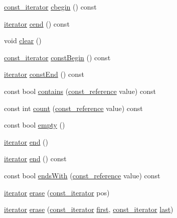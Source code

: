 \begin{DoxyCompactItemize}
\item 
\hyperlink{classprism_1_1_list_aafd1fe9c849b0369c3bf7bb0d456e0a3}{const\+\_\+iterator} \hyperlink{classprism_1_1_list_a305be84975076ea140f6f32be946225f}{cbegin} () const 
\item 
\hyperlink{classprism_1_1_list_a32f6b5634a5aabc496ccb652eb22c490}{iterator} \hyperlink{classprism_1_1_list_aab544551cf58b5ce23584c4f16d00d7e}{cend} () const 
\item 
void \hyperlink{classprism_1_1_list_a1e7dd9642cde1dca8834c8771560cd6b}{clear} ()
\item 
\hyperlink{classprism_1_1_list_aafd1fe9c849b0369c3bf7bb0d456e0a3}{const\+\_\+iterator} \hyperlink{classprism_1_1_list_af83c7a275d29cb26b5807c3b4cbbebf4}{const\+Begin} () const 
\item 
\hyperlink{classprism_1_1_list_a32f6b5634a5aabc496ccb652eb22c490}{iterator} \hyperlink{classprism_1_1_list_ab6464c9488a804007b2953a6a21b6e46}{const\+End} () const 
\item 
const bool \hyperlink{classprism_1_1_list_a47cd243e9c5db6058481d63ecc6ed5b7}{contains} (\hyperlink{classprism_1_1_list_aa263682b12cb5ca200c1b30f85fac524}{const\+\_\+reference} value) const 
\item 
const int \hyperlink{classprism_1_1_list_a7dbdab274aecfdc26b7d208f80772a78}{count} (\hyperlink{classprism_1_1_list_aa263682b12cb5ca200c1b30f85fac524}{const\+\_\+reference} value) const 
\item 
const bool \hyperlink{classprism_1_1_list_ae6b3ff8409a6548b695a9173a8bd4555}{empty} ()
\item 
\hyperlink{classprism_1_1_list_a32f6b5634a5aabc496ccb652eb22c490}{iterator} \hyperlink{classprism_1_1_list_a66e9cfc2a547294304d4fae086297bec}{end} ()
\item 
\hyperlink{classprism_1_1_list_a32f6b5634a5aabc496ccb652eb22c490}{iterator} \hyperlink{classprism_1_1_list_a36cedb2a64bbbe94da0c8e275132497c}{end} () const 
\item 
const bool \hyperlink{classprism_1_1_list_aff95005df96b82ff2b190c09a4845b30}{ends\+With} (\hyperlink{classprism_1_1_list_aa263682b12cb5ca200c1b30f85fac524}{const\+\_\+reference} value) const 
\item 
\hyperlink{classprism_1_1_list_a32f6b5634a5aabc496ccb652eb22c490}{iterator} \hyperlink{classprism_1_1_list_a9dcece97613f71fd9fac75d65f741ab4}{erase} (\hyperlink{classprism_1_1_list_aafd1fe9c849b0369c3bf7bb0d456e0a3}{const\+\_\+iterator} pos)
\item 
\hyperlink{classprism_1_1_list_a32f6b5634a5aabc496ccb652eb22c490}{iterator} \hyperlink{classprism_1_1_list_a632ad7eb2a121216e2cd9d3b810819fc}{erase} (\hyperlink{classprism_1_1_list_aafd1fe9c849b0369c3bf7bb0d456e0a3}{const\+\_\+iterator} \hyperlink{classprism_1_1_list_a403997c37906888fb96e612557fc7a05}{first}, \hyperlink{classprism_1_1_list_aafd1fe9c849b0369c3bf7bb0d456e0a3}{const\+\_\+iterator} \hyperlink{classprism_1_1_list_a674a1f2acb2580b63ec54964334721dd}{last})

\end{DoxyCompactItemize}
